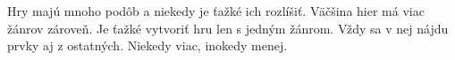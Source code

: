 \documentclass[10pt,oneside,slovak,a4paper]{article}
\begin{document}
Hry majú mnoho podôb a niekedy je ťažké ich rozlíšiť. Väčšina hier má viac žánrov zároveň. Je ťažké vytvoriť hru len s jedným žánrom. Vždy sa v nej nájdu prvky aj z ostatných. Niekedy viac, inokedy menej.



%






\end{document}
